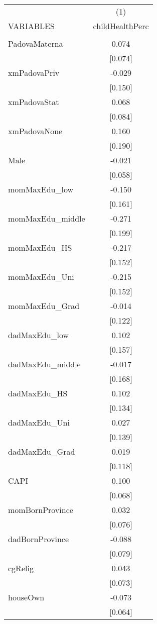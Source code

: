 \documentclass[]{article}
\begin{document}
\begin{tabular}{lc} \hline
 & (1) \\
VARIABLES & childHealthPerc \\ \hline
 &  \\
PadovaMaterna & 0.074 \\
 & [0.074] \\
xmPadovaPriv & -0.029 \\
 & [0.150] \\
xmPadovaStat & 0.068 \\
 & [0.084] \\
xmPadovaNone & 0.160 \\
 & [0.190] \\
Male & -0.021 \\
 & [0.058] \\
momMaxEdu\_low & -0.150 \\
 & [0.161] \\
momMaxEdu\_middle & -0.271 \\
 & [0.199] \\
momMaxEdu\_HS & -0.217 \\
 & [0.152] \\
momMaxEdu\_Uni & -0.215 \\
 & [0.152] \\
momMaxEdu\_Grad & -0.014 \\
 & [0.122] \\
dadMaxEdu\_low & 0.102 \\
 & [0.157] \\
dadMaxEdu\_middle & -0.017 \\
 & [0.168] \\
dadMaxEdu\_HS & 0.102 \\
 & [0.134] \\
dadMaxEdu\_Uni & 0.027 \\
 & [0.139] \\
dadMaxEdu\_Grad & 0.019 \\
 & [0.118] \\
CAPI & 0.100 \\
 & [0.068] \\
momBornProvince & 0.032 \\
 & [0.076] \\
dadBornProvince & -0.088 \\
 & [0.079] \\
cgRelig & 0.043 \\
 & [0.073] \\
houseOwn & -0.073 \\
 & [0.064] \\

\end{tabular}
\end{document}
